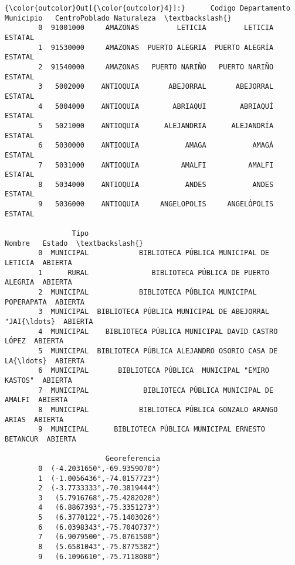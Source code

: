\documentclass[11pt]{article}
\begin{document}
\begin{Verbatim}[commandchars=\\\{\}]
{\color{outcolor}Out[{\color{outcolor}4}]:}      Codigo Departamento       Municipio   CentroPoblado Naturaleza  \textbackslash{}
        0  91001000     AMAZONAS         LETICIA         LETICIA    ESTATAL   
        1  91530000     AMAZONAS  PUERTO ALEGRIA  PUERTO ALEGRÍA    ESTATAL   
        2  91540000     AMAZONAS   PUERTO NARIÑO   PUERTO NARIÑO    ESTATAL   
        3   5002000    ANTIOQUIA       ABEJORRAL       ABEJORRAL    ESTATAL   
        4   5004000    ANTIOQUIA        ABRIAQUI        ABRIAQUÍ    ESTATAL   
        5   5021000    ANTIOQUIA      ALEJANDRIA      ALEJANDRÍA    ESTATAL   
        6   5030000    ANTIOQUIA           AMAGA           AMAGÁ    ESTATAL   
        7   5031000    ANTIOQUIA          AMALFI          AMALFI    ESTATAL   
        8   5034000    ANTIOQUIA           ANDES           ANDES    ESTATAL   
        9   5036000    ANTIOQUIA     ANGELOPOLIS     ANGELÓPOLIS    ESTATAL   
        
                Tipo                                             Nombre   Estado  \textbackslash{}
        0  MUNICIPAL            BIBLIOTECA PÚBLICA MUNICIPAL DE LETICIA  ABIERTA   
        1      RURAL               BIBLIOTECA PÚBLICA DE PUERTO ALEGRIA  ABIERTA   
        2  MUNICIPAL            BIBLIOTECA PÚBLICA MUNICIPAL POPERAPATA  ABIERTA   
        3  MUNICIPAL  BIBLIOTECA PÚBLICA MUNICIPAL DE ABEJORRAL "JAI{\ldots}  ABIERTA   
        4  MUNICIPAL    BIBLIOTECA PÚBLICA MUNICIPAL DAVID CASTRO LÓPEZ  ABIERTA   
        5  MUNICIPAL  BIBLIOTECA PÚBLICA ALEJANDRO OSORIO CASA DE LA{\ldots}  ABIERTA   
        6  MUNICIPAL       BIBLIOTECA PÙBLICA  MUNICIPAL "EMIRO KASTOS"  ABIERTA   
        7  MUNICIPAL             BIBLIOTECA PÚBLICA MUNICIPAL DE AMALFI  ABIERTA   
        8  MUNICIPAL            BIBLIOTECA PÚBLICA GONZALO ARANGO ARIAS  ABIERTA   
        9  MUNICIPAL      BIBLIOTECA PÚBLICA MUNICIPAL ERNESTO BETANCUR  ABIERTA   
        
                        Georeferencia  
        0  (-4.2031650°,-69.9359070°)  
        1  (-1.0056436°,-74.0157723°)  
        2  (-3.7733333°,-70.3819444°)  
        3   (5.7916768°,-75.4282028°)  
        4   (6.8867393°,-75.3351273°)  
        5   (6.3770122°,-75.1403026°)  
        6   (6.0398343°,-75.7040737°)  
        7   (6.9079500°,-75.0761500°)  
        8   (5.6581043°,-75.8775382°)  
        9   (6.1096610°,-75.7118080°)  
\end{Verbatim}
            
\end{document}
